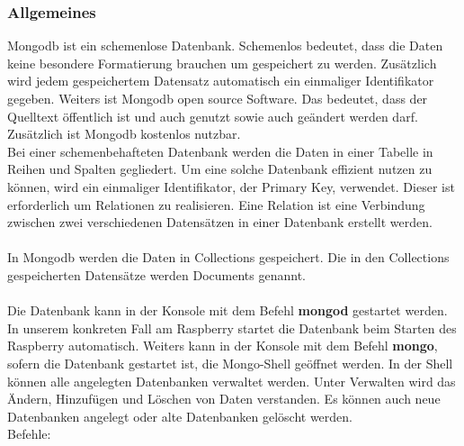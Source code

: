 \subsubsection{Allgemeines}
Mongodb ist ein schemenlose Datenbank. Schemenlos bedeutet, dass die Daten keine besondere Formatierung brauchen um gespeichert zu werden. Zusätzlich wird jedem gespeichertem Datensatz automatisch ein einmaliger Identifikator gegeben. Weiters ist Mongodb open source Software. Das bedeutet, dass der Quelltext öffentlich ist und auch genutzt sowie auch geändert werden darf. Zusätzlich ist Mongodb kostenlos nutzbar.
\\
Bei einer schemenbehafteten Datenbank werden die Daten in einer Tabelle in Reihen und Spalten gegliedert. Um eine solche Datenbank effizient nutzen zu können, wird ein einmaliger Identifikator, der Primary Key, verwendet. Dieser ist erforderlich um Relationen zu realisieren. Eine Relation ist eine Verbindung zwischen zwei verschiedenen Datensätzen in einer Datenbank erstellt werden.
\\ \\ 
In Mongodb werden die Daten in Collections gespeichert. Die in den Collections gespeicherten Datensätze werden Documents genannt. 
\\ \\
Die Datenbank kann in der Konsole mit dem Befehl \textbf{mongod} gestartet werden. In unserem konkreten Fall am Raspberry startet die Datenbank beim Starten des Raspberry automatisch. Weiters kann in der Konsole mit dem Befehl \textbf{mongo}, sofern die Datenbank gestartet ist, die Mongo-Shell geöffnet werden. In der Shell können alle angelegten Datenbanken verwaltet werden. Unter Verwalten wird das Ändern, Hinzufügen und Löschen von Daten verstanden. Es können auch neue Datenbanken angelegt oder alte Datenbanken gelöscht werden. 
\\ Befehle:

